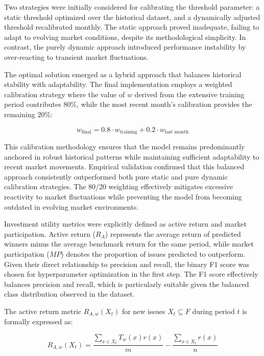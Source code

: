 Two strategies were initially considered for calibrating the threshold parameter: a static threshold optimized over the historical dataset, and a dynamically adjusted threshold recalibrated monthly. The static approach proved inadequate, failing to adapt to evolving market conditions, despite its methodological simplicity. In contrast, the purely dynamic approach introduced performance instability by over-reacting to transient market fluctuations.

The optimal solution emerged as a hybrid approach that balances historical stability with adaptability. The final implementation employs a weighted calibration strategy where the value of $w$ derived from the extensive training period contributes 80\%, while the most recent month's calibration provides the remaining 20\%:

\begin{equation}
\label{eq: weighted_calibration}
w_{\text{final}} = 0.8 \cdot w_{\text{training}} + 0.2 \cdot w_{\text{last month}}
\end{equation}

This calibration methodology ensures that the model remains predominantly anchored in robust historical patterns while maintaining sufficient adaptability to recent market movements. Empirical validation confirmed that this balanced approach consistently outperformed both pure static and pure dynamic calibration strategies. The 80/20 weighting effectively mitigates excessive reactivity to market fluctuations while preventing the model from becoming outdated in evolving market environments.

Investment utility metrics were explicitly defined as active return and market participation. Active return ($R_A$) represents the average return of predicted winners minus the average benchmark return for the same period, while market participation ($MP$) denotes the proportion of issues predicted to outperform. Given their direct relationship to precision and recall, the binary F1 score was chosen for hyperparameter optimization in the first step. The F1 score effectively balances precision and recall, which is particularly suitable given the balanced class distribution observed in the dataset.

The active return metric $R_{A,w}(X_t)$ for new issues $X_t \subseteq F$ during period $t$ is formally expressed as:

\begin{equation}
R_{A,w}(X_t) = \frac{\sum_{x \in X_t} T_w(x)r(x)}{m} - \frac{\sum_{x \in X_t} r(x)}{n}
\end{equation}

